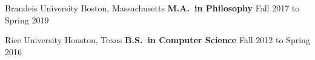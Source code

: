 \documentclass{resume}
\newcommand{\maru}[0]{Maru{\v s}i{\' c}}
\newcommand{\beri}[0]{Berislav \maru}
\newcommand{\jen}[0]{Jennifer \maru}
\begin{document}
    \EventWithSubtitle
    {\normalfont Brandeis University}
    {Boston, Massachusetts}
    {\bf M.A.~in Philosophy}
    {Fall 2017 to Spring 2019}%
    \iftoggle{cv}{
    }{}%

    \EventWithSubtitle
  {\normalfont Rice University}
  {Houston, Texas}
  {\bf B.S.~in Computer Science}
  {Fall 2012 to Spring 2016}%


\end{document}
